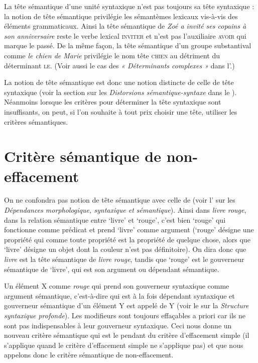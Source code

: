 La tête sémantique d’une unité syntaxique n’est pas toujours sa tête syntaxique : la notion de tête sémantique privilégie les sémantèmes lexicaux vis-à-vis des éléments grammaticaux. Ainsi la tête sémantique de \textit{Zoé a invité ses copains à son anniversaire} reste le verbe lexical \textsc{inviter} et n’est pas l’auxiliaire \textsc{avoir} qui marque le passé. De la même façon, la tête sémantique d’un groupe substantival comme \textit{le chien de Marie} privilégie le nom tête \textsc{chien} au détriment du déterminant \textsc{le}. (Voir aussi le cas des \textit{« Déterminants complexes »}
dans l'.)

La notion de tête sémantique est donc une notion distincte de celle de tête syntaxique (voir la section sur les \textit{Distorsions sémantique-syntaxe} dans le ). Néanmoins lorsque les critères pour déterminer la tête syntaxique sont insuffisants, on peut, si l’on souhaite à tout prix choisir une tête, utiliser les critères sémantiques.

\section{Critère sémantique de non-effacement}\label{sec:3.3.18}

On ne confondra pas notion de tête sémantique avec celle de  (voir l’ sur les \textit{Dépendances morphologique, syntaxique et sémantique}). 
Ainsi dans \textit{livre rouge}, dans la relation sémantique entre ‘livre’ et ‘rouge’, c’est bien ‘rouge’ qui fonctionne comme prédicat et prend ‘livre’ comme argument (‘rouge’ désigne une propriété qui comme toute propriété est la propriété de quelque chose, alors que ‘livre’ désigne un objet dont la couleur n’est pas définitoire). On dira donc que \textit{livre} est la tête sémantique de \textit{livre rouge}, tandis que ‘rouge’ est le gouverneur sémantique de ‘livre’, qui est son argument ou dépendant sémantique.

Un élément X comme \textit{rouge} qui prend son gouverneur syntaxique comme argument sémantique, c’est-à-dire qui est à la fois dépendant syntaxique et gouverneur sémantique d’un élément Y est appelé  de Y (voir le  sur la \textit{Structure syntaxique profonde}). Les modifieurs sont toujours effaçables a priori car ils ne sont pas indispensables à leur gouverneur syntaxique. Ceci nous donne un nouveau critère sémantique qui est le pendant du critère d’effacement simple (il s’applique quand le critère d’effacement simple ne s’applique pas) et que nous appelons donc le critère sémantique de non-effacement.

